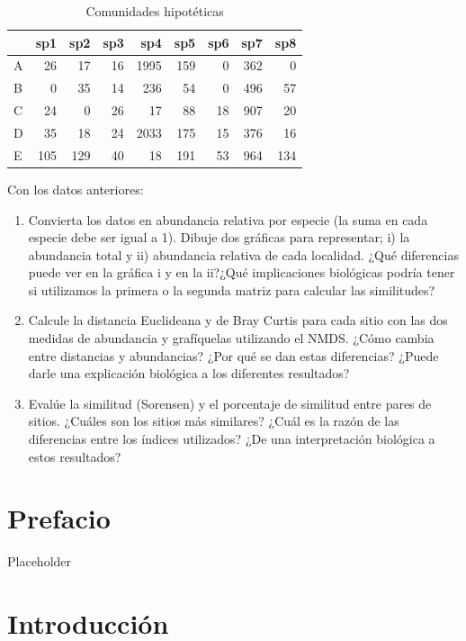 \documentclass[]{book}
\begin{document}
\begin{table}

\caption{\label{tab:ejer1}Comunidades hipotéticas}
\centering
\begin{tabular}[t]{lrrrrrrrr}
\toprule
  & sp1 & sp2 & sp3 & sp4 & sp5 & sp6 & sp7 & sp8\\
\midrule
A & 26 & 17 & 16 & 1995 & 159 & 0 & 362 & 0\\
B & 0 & 35 & 14 & 236 & 54 & 0 & 496 & 57\\
C & 24 & 0 & 26 & 17 & 88 & 18 & 907 & 20\\
D & 35 & 18 & 24 & 2033 & 175 & 15 & 376 & 16\\
E & 105 & 129 & 40 & 18 & 191 & 53 & 964 & 134\\
\bottomrule
\end{tabular}
\end{table}

Con los datos anteriores:

\begin{enumerate}
\def\labelenumi{\alph{enumi}.}
\item
  Convierta los datos en abundancia relativa por especie (la suma en
  cada especie debe ser igual a 1). Dibuje dos gráficas para
  representar; i) la abundancia total y ii) abundancia relativa de cada
  localidad. ¿Qué diferencias puede ver en la gráfica i y en la ii?¿Qué
  implicaciones biológicas podría tener si utilizamos la primera o la
  segunda matriz para calcular las similitudes?
\item
  Calcule la distancia Euclideana y de Bray Curtis para cada sitio con
  las dos medidas de abundancia y grafíquelas utilizando el NMDS. ¿Cómo
  cambia entre distancias y abundancias? ¿Por qué se dan estas
  diferencias? ¿Puede darle una explicación biológica a los diferentes
  resultados?
\item
  Evalúe la similitud (Sorensen) y el porcentaje de similitud entre
  pares de sitios. ¿Cuáles son los sitios más similares? ¿Cuál es la
  razón de las diferencias entre los índices utilizados? ¿De una
  interpretación biológica a estos resultados?
\end{enumerate}

\chapter*{Prefacio}\label{prefacio-1}

Placeholder

\chapter{Introducción}\label{introduccion-1}
\end{document}
